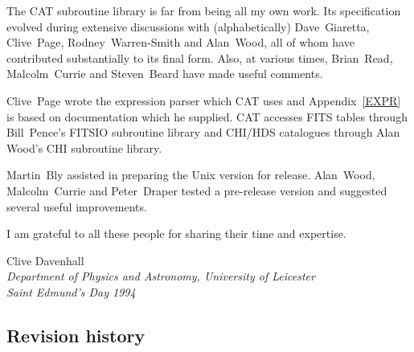 The CAT subroutine library is far from being all my own work. Its
specification evolved during extensive discussions with (alphabetically)
Dave~Giaretta, Clive~Page, Rodney~Warren-Smith and Alan~Wood, all of
whom have contributed substantially to its final form. Also, at various
times, Brian~Read, Malcolm~Currie and Steven~Beard have made useful
comments.

Clive~Page wrote the expression parser which CAT uses and
Appendix~\ref{EXPR} is based on documentation which he supplied. CAT
accesses FITS tables through Bill~Pence's FITSIO subroutine library
and CHI/HDS catalogues through Alan Wood's CHI subroutine library.

Martin~Bly assisted in preparing the Unix version for release.
Alan~Wood, Malcolm~Currie and Peter~Draper tested a pre-release version
and suggested several useful improvements.

I am grateful to all these people for sharing their time and expertise.
\begin{flushright}
Clive Davenhall \\
\latex{\raggedright} {\it Department of Physics and Astronomy, University of
Leicester \\
Saint Edmund's Day 1994}
\end{flushright}

\newpage
\subsection*{Revision history}


